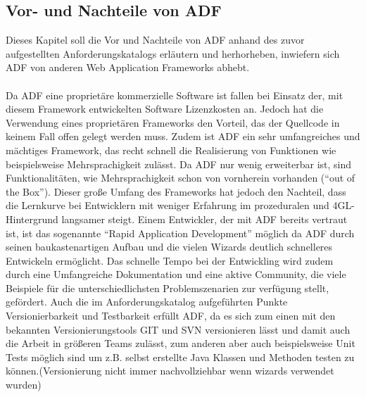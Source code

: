 \subsection{Vor- und Nachteile von ADF}
Dieses Kapitel soll die Vor und Nachteile von ADF anhand des zuvor aufgestellten Anforderungskatalogs erläutern und herhorheben, inwiefern sich ADF von anderen Web Application Frameworks abhebt.\\\\
Da ADF eine proprietäre kommerzielle Software ist fallen bei Einsatz der, mit diesem Framework entwickelten Software Lizenzkosten an. Jedoch hat die Verwendung eines proprietären Frameworks den Vorteil, das der Quellcode in keinem Fall offen gelegt werden muss. Zudem ist ADF ein sehr umfangreiches und mächtiges Framework, das recht schnell die Realisierung von Funktionen wie beispielsweise Mehrsprachigkeit zulässt. Da ADF nur wenig erweiterbar ist, sind Funktionalitäten, wie Mehrsprachigkeit schon von vornherein vorhanden ("`out of the Box"'). Dieser große Umfang des Frameworks hat jedoch den Nachteil, dass die Lernkurve bei Entwicklern mit weniger Erfahrung im prozeduralen und 4GL-Hintergrund langsamer steigt. Einem Entwickler, der mit ADF bereits vertraut ist, ist das sogenannte "`Rapid Application Development"' möglich da ADF durch seinen baukastenartigen Aufbau und die vielen Wizards deutlich schnelleres Entwickeln ermöglicht. Das schnelle Tempo bei der Entwickling wird zudem durch eine Umfangreiche Dokumentation und eine aktive Community, die viele Beispiele für die unterschiedlichsten Problemszenarien zur verfügung stellt, gefördert.
Auch die im Anforderungskatalog aufgeführten Punkte Versionierbarkeit und Testbarkeit erfüllt ADF, da es sich zum einen mit den bekannten Versionierungstools GIT und SVN versionieren lässt und damit auch die Arbeit in größeren Teams zulässt, zum anderen aber auch beispielsweise Unit Tests möglich sind um z.B. selbst erstellte Java Klassen und Methoden testen zu können.(Versionierung nicht immer nachvollziehbar wenn wizards verwendet wurden)
